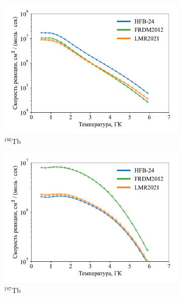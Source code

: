 \begin{figure}
\begin{subfigure}{0.48\textwidth}
    \includegraphics[width=\textwidth]{pics/n_tb186.pdf}
    \caption{${}^{186}$Tb}
  \end{subfigure}
  \hfil
  \begin{subfigure}{0.48\textwidth}
    \centering
    \includegraphics[width=\textwidth]{pics/n_tb187.pdf}
    \caption{${}^{187}$Tb}
  \end{subfigure}
  \\
  \begin{subfigure}{0.48\textwidth}
    \centering

\end{subfigure}
\end{figure}
